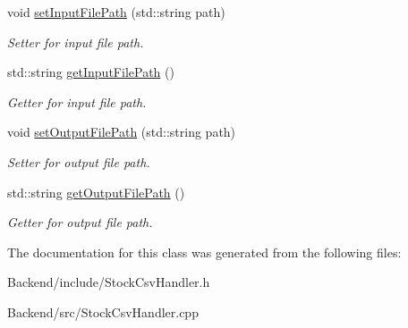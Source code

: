 \begin{DoxyCompactItemize}
\mbox{\label{class_stock_csv_handler_af0fa483a54671ac9cf6d14fb7991f3d3}} 
void \mbox{\hyperlink{class_stock_csv_handler_af0fa483a54671ac9cf6d14fb7991f3d3}{set\+Input\+File\+Path}} (std\+::string path)
\begin{DoxyCompactList}\small\item\em Setter for input file path. \end{DoxyCompactList}\item 
\mbox{\label{class_stock_csv_handler_a80849f00a57089ea30dde9947af3d4e3}} 
std\+::string \mbox{\hyperlink{class_stock_csv_handler_a80849f00a57089ea30dde9947af3d4e3}{get\+Input\+File\+Path}} ()
\begin{DoxyCompactList}\small\item\em Getter for input file path. \end{DoxyCompactList}\item 
\mbox{\label{class_stock_csv_handler_a99b233b75f7039bfed3cc1a699af942c}} 
void \mbox{\hyperlink{class_stock_csv_handler_a99b233b75f7039bfed3cc1a699af942c}{set\+Output\+File\+Path}} (std\+::string path)
\begin{DoxyCompactList}\small\item\em Setter for output file path. \end{DoxyCompactList}\item 
\mbox{\label{class_stock_csv_handler_aba4991b48238f173ecbe9b29ab850a0a}} 
std\+::string \mbox{\hyperlink{class_stock_csv_handler_aba4991b48238f173ecbe9b29ab850a0a}{get\+Output\+File\+Path}} ()
\begin{DoxyCompactList}\small\item\em Getter for output file path. \end{DoxyCompactList}\end{DoxyCompactItemize}


The documentation for this class was generated from the following files\+:\begin{DoxyCompactItemize}
\item 
Backend/include/Stock\+Csv\+Handler.\+h\item 
Backend/src/Stock\+Csv\+Handler.\+cpp\end{DoxyCompactItemize}
